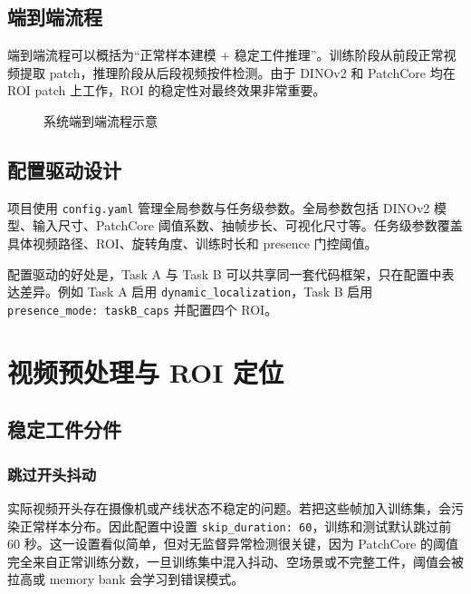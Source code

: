 \documentclass[12pt,hyperref,a4paper,UTF8,fontset=fandol]{ctexart}
\begin{document}
\subsection{端到端流程}

端到端流程可以概括为“正常样本建模 + 稳定工件推理”。训练阶段从前段正常视频提取 patch，推理阶段从后段视频按件检测。由于 DINOv2 和 PatchCore 均在 ROI patch 上工作，ROI 的稳定性对最终效果非常重要。

\begin{figure}[H]
    \centering
    \caption{系统端到端流程示意}
\end{figure}

\subsection{配置驱动设计}

项目使用 \texttt{config.yaml} 管理全局参数与任务级参数。全局参数包括 DINOv2 模型、输入尺寸、PatchCore 阈值系数、抽帧步长、可视化尺寸等。任务级参数覆盖具体视频路径、ROI、旋转角度、训练时长和 presence 门控阈值。

配置驱动的好处是，Task A 与 Task B 可以共享同一套代码框架，只在配置中表达差异。例如 Task A 启用 \texttt{dynamic\_localization}，Task B 启用 \texttt{presence\_mode: taskB\_caps} 并配置四个 ROI。

\newpage
\section{视频预处理与 ROI 定位}

\subsection{稳定工件分件}

\subsubsection{跳过开头抖动}

实际视频开头存在摄像机或产线状态不稳定的问题。若把这些帧加入训练集，会污染正常样本分布。因此配置中设置 \texttt{skip\_duration: 60}，训练和测试默认跳过前 60 秒。这一设置看似简单，但对无监督异常检测很关键，因为 PatchCore 的阈值完全来自正常训练分数，一旦训练集中混入抖动、空场景或不完整工件，阈值会被拉高或 memory bank 会学习到错误模式。
\end{document}
